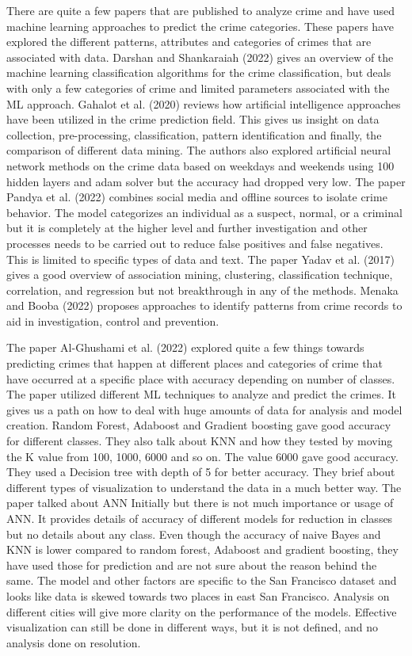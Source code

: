 \documentclass[conference,final,]{IEEEtran}
\begin{document}
There are quite a few papers that are published to analyze crime and
have used machine learning approaches to predict the crime categories.
These papers have explored the different patterns, attributes and
categories of crimes that are associated with data. Darshan and
Shankaraiah (2022) gives an overview of the machine learning
classification algorithms for the crime classification, but deals with
only a few categories of crime and limited parameters associated with
the ML approach. Gahalot et al. (2020) reviews how artificial
intelligence approaches have been utilized in the crime prediction
field. This gives us insight on data collection, pre-processing,
classification, pattern identification and finally, the comparison of
different data mining. The authors also explored artificial neural
network methods on the crime data based on weekdays and weekends using
100 hidden layers and adam solver but the accuracy had dropped very low.
The paper Pandya et al. (2022) combines social media and offline sources
to isolate crime behavior. The model categorizes an individual as a
suspect, normal, or a criminal but it is completely at the higher level
and further investigation and other processes needs to be carried out to
reduce false positives and false negatives. This is limited to specific
types of data and text. The paper Yadav et al. (2017) gives a good
overview of association mining, clustering, classification technique,
correlation, and regression but not breakthrough in any of the methods.
Menaka and Booba (2022) proposes approaches to identify patterns from
crime records to aid in investigation, control and prevention.

The paper Al-Ghushami et al. (2022) explored quite a few things towards
predicting crimes that happen at different places and categories of
crime that have occurred at a specific place with accuracy depending on
number of classes. The paper utilized different ML techniques to analyze
and predict the crimes. It gives us a path on how to deal with huge
amounts of data for analysis and model creation. Random Forest, Adaboost
and Gradient boosting gave good accuracy for different classes. They
also talk about KNN and how they tested by moving the K value from 100,
1000, 6000 and so on. The value 6000 gave good accuracy. They used a
Decision tree with depth of 5 for better accuracy. They brief about
different types of visualization to understand the data in a much better
way. The paper talked about ANN Initially but there is not much
importance or usage of ANN. It provides details of accuracy of different
models for reduction in classes but no details about any class. Even
though the accuracy of naive Bayes and KNN is lower compared to random
forest, Adaboost and gradient boosting, they have used those for
prediction and are not sure about the reason behind the same. The model
and other factors are specific to the San Francisco dataset and looks
like data is skewed towards two places in east San Francisco. Analysis
on different cities will give more clarity on the performance of the
models. Effective visualization can still be done in different ways, but
it is not defined, and no analysis done on resolution.
\end{document}
